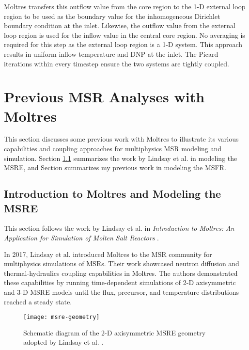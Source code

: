 Moltres transfers this outflow value from the core region to the 1-D
external loop region to be used as the boundary value for the inhomogeneous
Dirichlet boundary
condition at the inlet. Likewise, the outflow value from the external
loop region is used for the inflow value in the central core region. No
averaging is required for this step as the external loop region is a 1-D system.
This approach results in uniform inflow temperature and \gls{DNP} at the
inlet. The Picard iterations within every timestep ensure the two systems
are tightly coupled.

\section{Previous \gls{MSR} Analyses with Moltres} \label{sec:moltres-previous}

This section discusses some previous work with Moltres to illustrate its
various capabilities and coupling approaches for multiphysics \gls{MSR}
modeling and simulation. Section \ref{sec:msre} summarizes the work by Lindsay et
al. \cite{lindsay_introduction_2018} in modeling the \gls{MSRE}, and Section
\cite{park_advancement_2020} summarizes my previous work in modeling the
\gls{MSFR}.

\subsection{Introduction to Moltres and Modeling the MSRE} \label{sec:msre}

This section follows the work by Lindsay et al. in \textit{Introduction to Moltres:
An Application for Simulation of Molten Salt Reactors}
\cite{lindsay_introduction_2018}.

In 2017, Lindsay et al. introduced
Moltres to the \gls{MSR} community for multiphysics simulations of \glspl{MSR}.
Their work showcased neutron diffusion and thermal-hydraulics coupling
capabilities in Moltres. The authors
demonstrated these capabilities by running time-dependent simulations of 2-D
axisymmetric and 3-D \gls{MSRE} models until the flux, precursor, and
temperature distributions reached a steady state.

\begin{figure}[htb!]
	\centering
	\texttt{[image: msre-geometry]}
	\caption{Schematic diagram of the 2-D axisymmetric \gls{MSRE} geometry
	adopted by Lindsay et al. \cite{lindsay_introduction_2018}.}
	\label{fig:msre-geometry}
\end{figure}

